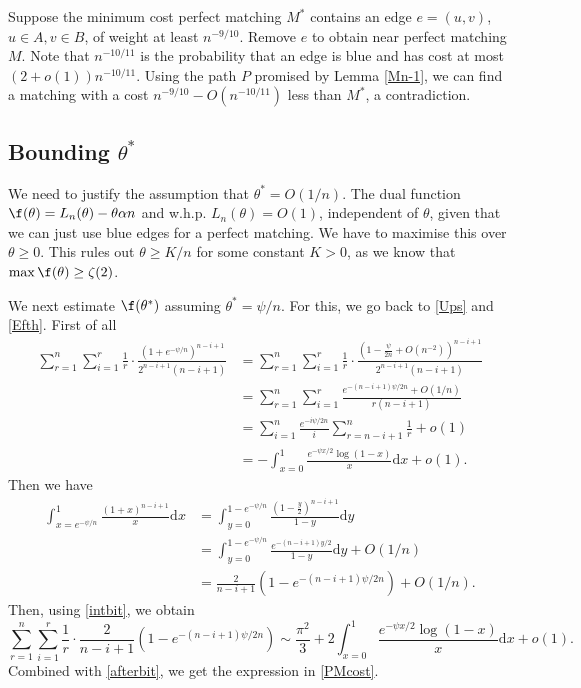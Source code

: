 \documentclass[12pt]{article}
\newcommand{\1}{\textbf{1}}
\def\nn{\nonumber}
\def\a{\alpha} \def\b{\beta} \def\d{\delta} \def\D{\Delta}
\def\z{\zeta} \def\th{\theta} \def\TH{\Theta} \def\Th{\Theta}  \def\l{\lambda}
\newcommand{\brac}[1]{\left(#1\right)}
\def\dd{\text{d}}
\def\nn{\nonumber}
\begin{document}
Suppose the minimum cost perfect matching $M^*$ contains an edge $e=(u,v)$, $u \in A, v \in B$,  of weight at least $n^{-9/10}$.  Remove $e$ to obtain near perfect matching $M$. Note that $n^{-10/11}$ is the probability that an edge is blue and has cost at most $(2+o(1))n^{-10/11}$. Using the path $P$ promised by Lemma \ref{Mn-1}, we can find a matching with a cost $n^{-9/10}-O(n^{-10/11})$ less than $M^*$, a contradiction. 
\subsection{Bounding $\th^*$}\label{sec:boundingtheta}
We need to justify the assumption that $\th^*=O(1/n)$. The dual function $\f(\th)=L_n(\th)-\th\a n$ and w.h.p. $L_n(\th)=O(1)$, independent of $\th$, given that we can just use blue edges for a perfect matching. We have to maximise this over $\th\geq 0$.
This rules out $\th\geq K/n$ for some constant $K>0$, as we know that $\max\f(\th)\geq \z(2)$.

We next estimate $\f(\th^*)$ assuming $\th^*=\psi/n$. For this, we go back to \eqref{Ups} and \eqref{Efth}. First of all
\begin{align}
\sum_{r=1}^n\sum_{i=1}^r\frac1r \cdot \frac{(1+e^{-\psi/n})^{n-i+1}}{2^{n-i+1}(n-i+1)}&=\sum_{r=1}^n\sum_{i=1}^r\frac1r\cdot \frac{(1-\frac{\psi}{2n}+O(n^{-2}))^{n-i+1}}{2^{n-i+1}(n-i+1)}\nn\\
&=\sum_{r=1}^n\sum_{i=1}^r\frac{e^{-(n-i+1)\psi/2n}+O(1/n)}{r(n-i+1)}\label{intbit}\\
&=\sum_{i=1}^n\frac{e^{-i\psi/2n}}{i}\sum_{r=n-i+1}^n\frac{1}{r}+o(1)\nn\\
&=-\int_{x=0}^1\frac{e^{-\psi x/2}\log(1-x)}{x}\dd x+o(1).\label{afterbit}
\end{align}
Then we have
\begin{align*}
\int_{x=e^{-\psi/n}}^1\frac{(1+x)^{n-i+1}}{x}\dd x&=\int_{y=0}^{1-e^{-\psi/n}}\frac{\brac{1-\frac{y}{2}}^{n-i+1}}{1-y}\dd y\\
&=\int_{y=0}^{1-e^{-\psi/n}}\frac{e^{-(n-i+1)y/2}}{1-y}\dd y+O(1/n)\\
&=\frac{2}{n-i+1}(1-e^{-(n-i+1)\psi/2n})+O(1/n).
\end{align*}
Then, using \eqref{intbit}, we obtain
\[
\sum_{r=1}^n\sum_{i=1}^r\frac1r \cdot \frac{2}{n-i+1}(1-e^{-(n-i+1)\psi/2n})\sim \frac{\pi^2}{3}+2\int_{x=0}^1\frac{e^{-\psi x/2}\log(1-x)}{x}\dd x+o(1).
\]
Combined with \eqref{afterbit}, we get the expression in \eqref{PMcost}.
\end{document}
